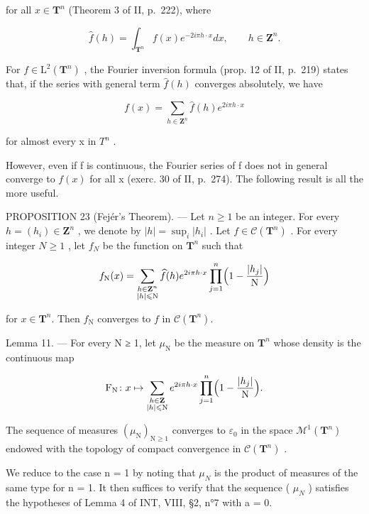 for all \(x \in \mathbf{T}^n\) (Theorem 3 of II, p.~222), where

\[
\widehat {f} (h) = \int_ {\mathbf {T} ^ {n}} f (x) e ^ {- 2 i \pi h \cdot x} d x, \qquad h \in \mathbf {Z} ^ {n}.
\]

For \(f \in \mathrm{L}^2(\mathbf{T}^n)\) , the Fourier inversion formula (prop. 12 of II, p.~219) states that, if the series with general term \(\widehat{f}(h)\) converges absolutely, we have

\[
f (x) = \sum_ {h \in \mathbf {Z} ^ {n}} \widehat {f} (h) e ^ {2 i \pi h \cdot x}
\]

for almost every x in \(T^{n}\) .

However, even if f is continuous, the Fourier series of f does not in general converge to \(f(x)\) for all x (exerc. 30 of II, p.~274). The following result is all the more useful.

PROPOSITION 23 (Fejér's Theorem). --- Let \(n \geqslant 1\) be an integer. For every \(h = (h_i) \in \mathbf{Z}^n\) , we denote by \(|h| = \sup_i |h_i|\) . Let \(f \in \mathcal{C}(\mathbf{T}^n)\) . For every integer \(N \geqslant 1\) , let \(f_N\) be the function on \(\mathbf{T}^n\) such that

\[
f_{\mathrm{N}}(x) = \sum_{\substack{h\in \mathbf{Z}^{n}\\ |h|\leqslant \mathrm{N}}}\widehat{f} (h)e^{2i\pi h\cdot x}\prod_{j = 1}^{n}\Bigl (1 - \frac{|h_{j}|}{\mathrm{N}}\Bigr)
\]

for \(x\in \mathbf{T}^n\). Then \(f_{\mathrm{N}}\) converges to \(f\) in \(\mathcal{C}(\mathbf{T}^n)\).

Lemma 11. --- For every N ≥ 1, let \(\mu_{\mathrm{N}}\) be the measure on \(\mathbf{T}^{n}\) whose density is the continuous map

\[
\mathrm{F}_{\mathrm{N}}\colon x\mapsto \sum_{\substack{h\in \mathbf{Z}\\ |h|\leqslant \mathrm{N}}}e^{2i\pi h\cdot x}\prod_{j = 1}^{n}\Bigl (1 - \frac{|h_{j}|}{\mathrm{N}}\Bigr).
\]

The sequence of measures \((\mu_{\mathrm{N}})_{\mathrm{N}\geqslant1}\) converges to \(\varepsilon_{0}\) in the space \(\mathcal{M}^{1}(\mathbf{T}^{n})\) endowed with the topology of compact convergence in \(\mathcal{C}(\mathbf{T}^{n})\) .

We reduce to the case n = 1 by noting that \(\mu_{N}\) is the product of measures of the same type for n = 1. It then suffices to verify that the sequence ( \(\mu_{N}\) ) satisfies the hypotheses of Lemma 4 of INT, VIII, §2, n°7 with a = 0.

